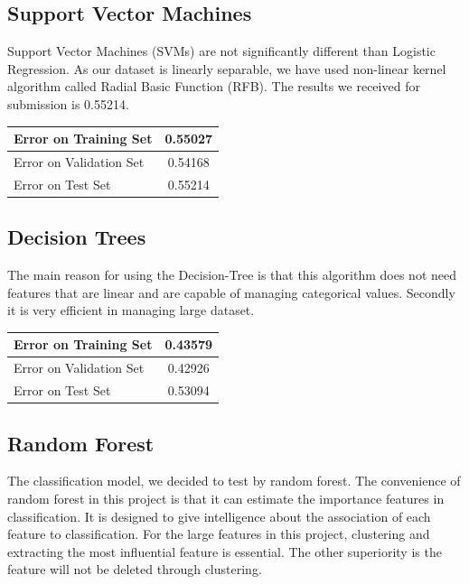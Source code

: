 \documentclass[conference, onecolumn]{IEEEtran}
\begin{document}
\subsection{Support Vector Machines}

Support Vector Machines (SVMs) are not significantly different than Logistic Regression. As our dataset is linearly separable, we have used non-linear kernel algorithm called Radial Basic Function (RFB). The results we received for submission is 0.55214.

\begin{center}
\begin{tabular}{ |l|c| } 
 \hline
Error on Training Set & 0.55027  \\ \hline
Error on Validation Set & 0.54168 \\ \hline
Error on Test Set & 0.55214\\ \hline
\end{tabular}
\end{center}

\subsection{Decision Trees}

The main reason for using the Decision-Tree is that this algorithm does not need features that are linear and are capable of managing categorical values. Secondly it is very efficient in managing large dataset. 

\begin{center}
\begin{tabular}{ |l|c| } 
 \hline
Error on Training Set & 0.43579  \\ \hline
Error on Validation Set & 0.42926 \\ \hline
Error on Test Set & 0.53094\\ \hline
\end{tabular}
\end{center}

\subsection{Random Forest}


The classification model, we decided to test by random forest. The convenience of random forest in this project is that it can estimate the importance features in classification. It is designed to give intelligence about the association of each feature to classification. For the large features in this project, clustering and extracting the most influential feature is essential. The other superiority is the feature will not be deleted through clustering. 
\end{document}
